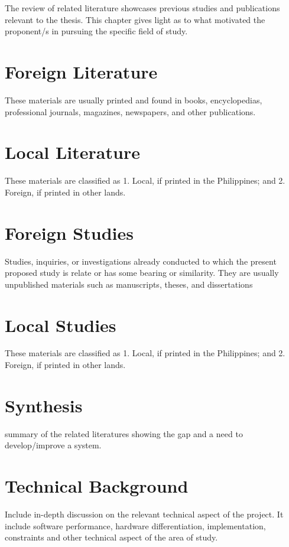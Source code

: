 The review of related literature showcases previous studies and publications relevant to the thesis. This chapter gives light as to what motivated the proponent/s in pursuing the specific field of study. 

\section{Foreign Literature}
These materials are usually printed and found in books, encyclopedias, professional journals, magazines, newspapers, and other publications.

\section{Local Literature}
These materials are classified as 1. Local, if printed in the Philippines; and 2. Foreign, if printed in other lands.

\section{Foreign Studies}
Studies, inquiries, or investigations already conducted to which the present proposed study is relate or has some bearing or similarity. They are usually unpublished materials such as manuscripts, theses, and dissertations

\section{Local Studies}
These materials are classified as 1. Local, if printed in the Philippines; and 2. Foreign, if printed in other lands.

\section{Synthesis}
summary of the related literatures showing the gap and a need to develop/improve a system.

\section{Technical Background} 
Include in-depth discussion on the relevant technical aspect of the project. It include software performance, hardware differentiation, implementation, constraints and other technical aspect of the area of study.